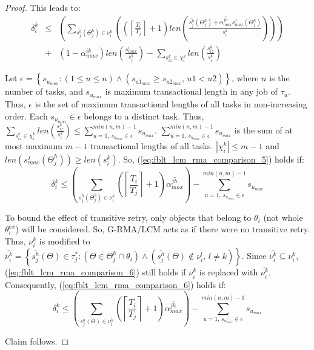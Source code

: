 \documentclass[a4paper,english]{article}
\newtheorem{proof}{Proof}
\begin{document}
\begin{proof}
This leads to:
\begin{eqnarray}
\delta_i^k & \le & \left(\sum_{\bar{s_{j}^{h}}(\Theta_j^h)\in\nu_{i}^{k}}\left(\left(\left\lceil \frac{T_{i}}{T_{j}}\right\rceil +1\right)len\left(\frac{\bar{s_{j}^{h}}(\Theta_j^h)+\bar{\alpha_{max}^{jh}}s_{max}^{j}(\Theta_j^h)}{s_{i}^{k}}\right)\right)\right)\nonumber \\
 & + & \left(1-\alpha_{max}^{ik}\right)len\left(\frac{s_{max}^{i}}{s_{i}^{k}}\right)-\sum_{s_{iz}^{k}\in\chi_{i}^{k}}len\left(\frac{s_{iz}^{k}}{s_{i}^{k}}\right)\label{eq:fblt_lcm_rma_comparison_5}
\end{eqnarray}

%

Let $\epsilon=\left\{s_{u_{max}}:(1\le u \le n)\wedge \left(s_{u1_{max}} \ge s_{u2_{max}},\,u1 < u2 \right)\right\}$, where $n$ is the number of tasks, and $s_{u_{max}}$ is maximum transactional length in any job of $\tau_u$. Thus, $\epsilon$ is the set of maximum transactional lengths of all tasks in non-increasing order. Each $s_{u_{max}} \in \epsilon$ belongs to a distinct task. Thus, $\sum_{s_{iz}^k \in \chi_i^k}len\left(\frac{s_{iz}^{k}}{s_{i}^{k}}\right)\le \sum_{u=1,\,s_{u_{max}}\in \epsilon}^{min(n,m)-1} s_{u_{max}}$. $\sum_{u=1,\,s_{u_{max}}\in \epsilon}^{min(n,m)-1} s_{u_{max}}$ is the sum of at most maximum $m-1$ transactional lengths of all tasks. $|\chi_i^k|\le m-1$ and $len(s_{max}^{j}(\Theta_j^h)) \ge len(s_{i}^{k})$. So, (\ref{eq:fblt_lcm_rma_comparison_5}) holds if: 
\begin{equation}
\delta_i^k\le\left(\sum_{\bar{s_{j}^{h}}(\Theta_j^h)\in\nu_{i}^{k}}\left(\left\lceil \frac{T_{i}}{T_{j}}\right\rceil +1\right)\bar{\alpha_{max}^{jh}}\right)-\sum_{u=1,\,s_{u_{max}}\in \epsilon}^{min(n,m)-1} s_{u_{max}}\label{eq:fblt_lcm_rma_comparison_6}
\end{equation}

To bound the effect of transitive retry, only objects that belong to $\theta_i$ (not whole $\theta_i^{ex}$) will be considered. So, G-RMA/LCM acts as if there were no transitive retry. Thus, $\nu_i^k$ is modified to $\bar{\nu_i^k}=\left\{ \bar{s_{j}^{h}}(\Theta)\in\tau_{j}^{*}:\left(\Theta \in \Theta_j^h \cap \theta_{i}\right)\wedge\left(\bar{s_{j}^{h}}(\Theta)\not\in\nu_{i}^{l},\, l\ne k\right)\right\}$. Since $\bar{\nu_i^k} \subseteq \nu_i^k$, (\ref{eq:fblt_lcm_rma_comparison_6}) still holds if $\nu_i^k$ is replaced with $\bar{\nu_i^k}$.  Consequently, (\ref{eq:fblt_lcm_rma_comparison_6}) holds if:
\begin{equation}
\delta_i^k\le\left(\sum_{\bar{s_{j}^{h}}(\Theta)\in \bar{\nu_{i}^{k}}}\left(\left\lceil \frac{T_{i}}{T_{j}}\right\rceil +1\right)\bar{\alpha_{max}^{jh}}\right)-\sum_{u=1,\,s_{u_{max}}\in \epsilon}^{min(n,m)-1} s_{u_{max}}\label{eq:fblt_lcm_rma_comparison_7}
\end{equation}

Claim follows.

\end{proof}
\end{document}
